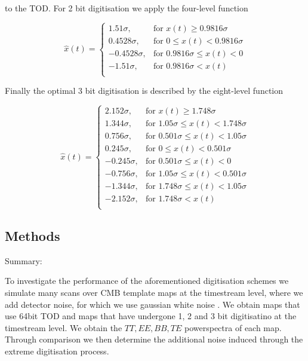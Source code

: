 \documentclass[apj]{emulateapj}
\begin{document}
to the TOD. For 2 bit digitisation we apply the four-level function

\[ \hat{x}(t) = \left\{ \begin{array}{lr}
1.51 \sigma, & \text{for } x(t) \geq 0.9816 \sigma\\
0.4528 \sigma, & \text{for } 0 \leq x(t) < 0.9816 \sigma\\
-0.4528 \sigma, & \text{for } 0.9816 \sigma \leq x(t) < 0\\
-1.51 \sigma, & \text{for } 0.9816 \sigma < x(t)\\
\end{array} \right. \]

Finally the optimal 3 bit digitisation is described by the eight-level function

\[ \hat{x}(t) = \left\{ \begin{array}{lr}
2.152 \sigma, & \text{for } x(t) \geq 1.748 \sigma\\
1.344 \sigma, & \text{for } 1.05 \sigma \leq x(t) < 1.748 \sigma\\
0.756 \sigma, & \text{for } 0.501 \sigma \leq x(t) < 1.05 \sigma\\
0.245 \sigma, & \text{for } 0 \leq x(t) < 0.501 \sigma\\
-0.245 \sigma, & \text{for } 0.501 \sigma \leq x(t) < 0\\
-0.756 \sigma, & \text{for } 1.05 \sigma \leq x(t) < 0.501 \sigma\\
-1.344 \sigma, & \text{for } 1.748 \sigma \leq x(t) < 1.05 \sigma\\
-2.152 \sigma, & \text{for } 1.748 \sigma < x(t)\\
\end{array} \right. \]


\subsection{Methods}
\label{subsec:method}

Summary:

To investigate the performance of the aforementioned digitisation schemes we simulate many scans over CMB template maps at the timestream level, where we add detector noise, for which we use gaussian white noise . We obtain maps that use 64bit TOD and maps that have undergone 1, 2 and 3 bit digitisatino at the timestream level. We obtain the $TT, EE, BB, TE$ powerspectra of each map. Through comparison we then determine the additional noise induced through the extreme digitisation process.
\end{document}

